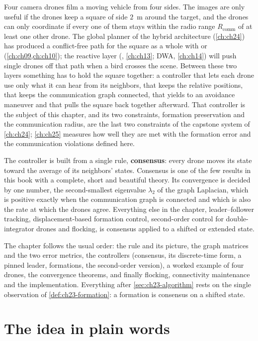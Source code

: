 Four camera drones film a moving vehicle from four sides. The images are only
useful if the drones keep a square of side $2$~m around the target, and the
drones can only coordinate if every one of them stays within the radio range
$R_{\mathrm{comm}}$ of at least one other drone. The global planner of the
hybrid architecture (\cref{ch:ch24}) has produced a conflict-free path for the
square as a whole with \cbs or \ecbs (\cref{ch:ch09,ch:ch10}); the reactive
layer (\orca, \cref{ch:ch13}; DWA, \cref{ch:ch14}) will push single drones off
that path when a bird crosses the scene. Between these two layers something has
to hold the square together: a controller that lets each drone use only what
it can hear from its neighbors, that keeps the relative positions, that keeps
the communication graph connected, that yields to an avoidance maneuver and
that pulls the square back together afterward. That controller is the subject
of this chapter, and its two constraints, formation preservation and the
communication radius, are the last two constraints of the capstone system of
\cref{ch:ch24}; \cref{ch:ch25} measures how well they are met with the
formation error and the communication violations defined here.

The controller is built from a single rule, \textbf{consensus}: every drone
moves its state toward the average of its neighbors' states. Consensus is
one of the few results in this book with a complete, short and beautiful
theory. Its convergence is decided by one number, the second-smallest
eigenvalue $\lambda_2$ of the graph Laplacian, which is positive exactly when
the communication graph is connected and which is also the rate at which the
drones agree. Everything else in the chapter, leader--follower tracking,
displacement-based formation control, second-order control for
double-integrator drones and flocking, is consensus applied to a shifted or
extended state.

The chapter follows the usual order: the rule and its picture, the graph
matrices and the two error metrics, the controllers (consensus, its
discrete-time form, a pinned leader, formations, the second-order version), a
worked example of four drones, the convergence theorems, and finally flocking,
connectivity maintenance and the implementation. Everything after
\cref{sec:ch23-algorithm} rests on the single observation of
\cref{def:ch23-formation}: a formation is consensus on a shifted state.

\section{The idea in plain words}
\label{sec:ch23-intuition}

